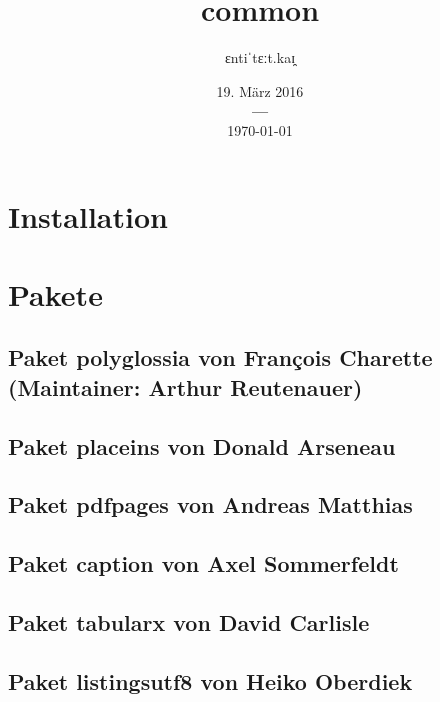 \documentclass[a4paper,12pt]{article}
\title{\fontspec{Times New Roman}common}
\title{\fontspec{Times New Roman}\common}
\author{\fontspec{Times New Roman}ɛntiˈtɛːt.kaɪ̯}
\date{%
			{\fontspec{Times New Roman}19. März 2016} \\
			{\bf---} \\[0.2\baselineskip]
			\fontspec{Times New Roman}\today}
\begin{document}
		\listoftodos

		

		\maketitle

		

		\tableofcontents  %
		\tableofcontents    %
		\listoffigures      %
		\listoftables       %
		\lstlistoflistings  %

		\chapter{Installation}
		\chapter{Pakete}
			\section{Paket polyglossia von François Charette (Maintainer: Arthur
				Reutenauer)}
				
			\section{Paket placeins von Donald Arseneau}
				
			\section{Paket pdfpages von Andreas Matthias}
				
			\section{Paket caption von Axel Sommerfeldt}
				
			\section{Paket tabularx von David Carlisle}
				
			\section{Paket listingsutf8 von Heiko Oberdiek}
				
\end{document}
